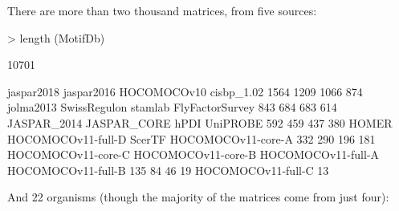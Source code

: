 \documentclass{article}
\renewenvironment{Schunk}{\vspace{\topsep}}{\vspace{\topsep}}
\begin{document}
There are  more than two thousand  matrices, from five sources:
\begin{Schunk}
\begin{Sinput}
> length (MotifDb)
\end{Sinput}
\begin{Soutput}
[1] 10701
\end{Soutput}
\begin{Soutput}
        jaspar2018         jaspar2016        HOCOMOCOv10         cisbp_1.02 
              1564               1209               1066                874 
         jolma2013       SwissRegulon            stamlab    FlyFactorSurvey 
               843                684                683                614 
       JASPAR_2014        JASPAR_CORE               hPDI           UniPROBE 
               592                459                437                380 
             HOMER HOCOMOCOv11-full-D             ScerTF HOCOMOCOv11-core-A 
               332                290                196                181 
HOCOMOCOv11-core-C HOCOMOCOv11-core-B HOCOMOCOv11-full-A HOCOMOCOv11-full-B 
               135                 84                 46                 19 
HOCOMOCOv11-full-C 
                13 
\end{Soutput}
\end{Schunk}
And 22 organisms (though the majority of the matrices come from just four):
\end{document}
